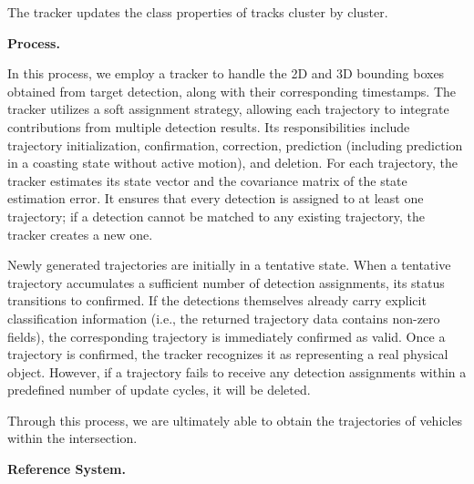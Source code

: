\documentclass[lettersize,journal]{IEEEtran}
\begin{document}
The tracker updates the class properties of tracks cluster by cluster.

\textbf{Process.}

In this process, we employ a tracker to handle the 2D and 3D bounding boxes obtained from target detection, along with their corresponding timestamps. 
The tracker utilizes a soft assignment strategy, allowing each trajectory to integrate contributions from multiple detection results. 
Its responsibilities include trajectory initialization, confirmation, correction, prediction (including prediction in a coasting state without active motion), and deletion. 
For each trajectory, the tracker estimates its state vector and the covariance matrix of the state estimation error. 
It ensures that every detection is assigned to at least one trajectory; if a detection cannot be matched to any existing trajectory, the tracker creates a new one.

Newly generated trajectories are initially in a tentative state. 
When a tentative trajectory accumulates a sufficient number of detection assignments, its status transitions to confirmed. 
If the detections themselves already carry explicit classification information (i.e., the returned trajectory data contains non-zero fields), the corresponding trajectory is immediately confirmed as valid. 
Once a trajectory is confirmed, the tracker recognizes it as representing a real physical object. 
However, if a trajectory fails to receive any detection assignments within a predefined number of update cycles, it will be deleted.

Through this process, we are ultimately able to obtain the trajectories of vehicles within the intersection.

\textbf{Reference System.}
\end{document}
